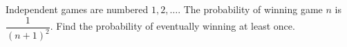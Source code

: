 Independent games are numbered $1,2,\ldots$. The probability of winning game $n$ is $\dfrac{1}{(n+1)^2}$. Find the probability of eventually winning at least once.
